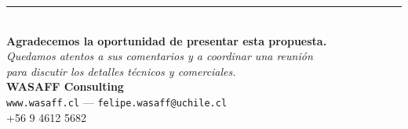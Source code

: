 \documentclass[11pt,a4paper]{article}
\begin{document}
\vspace{2cm}

\begin{center}
\rule{0.6\textwidth}{0.5pt}\\[0.5cm]
\textbf{Agradecemos la oportunidad de presentar esta propuesta.}\\[0.3cm]
\textit{Quedamos atentos a sus comentarios y a coordinar una reunión}\\
\textit{para discutir los detalles técnicos y comerciales.}\\[1cm]
\textbf{WASAFF Consulting}\\
\texttt{www.wasaff.cl} — \texttt{felipe.wasaff@uchile.cl}\\
+56 9 4612 5682
\end{center}
\end{document}
